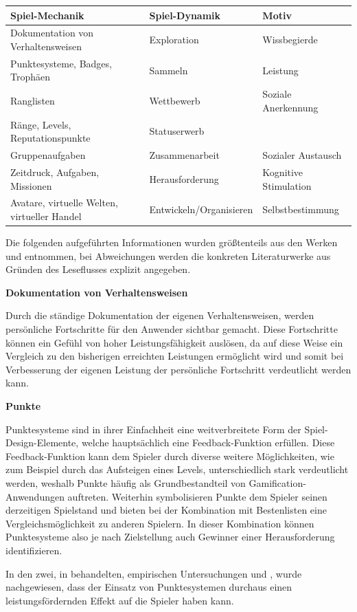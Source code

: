 \documentclass[bibliography=totoc,listof=totoc,BCOR=5mm,DIV=12,oneside]{scrbook}
\begin{document}
\bigskip
\begin{tabularx}{\textwidth}{l|l|X}
	\toprule
	\textbf{Spiel-Mechanik} & \textbf{Spiel-Dynamik} & \textbf{Motiv}\\ \midrule
	Dokumentation von Verhaltensweisen & Exploration & Wissbegierde\\
	Punktesysteme, Badges, Trophäen & Sammeln  & Leistung\\
	Ranglisten & Wettbewerb & Soziale Anerkennung\\ 
	Ränge, Levels, Reputationspunkte & Statuserwerb  & \\
	Gruppenaufgaben & Zusammenarbeit  & Sozialer Austausch\\
	Zeitdruck, Aufgaben, Missionen & Herausforderung & Kognitive Stimulation\\ 
	Avatare, virtuelle Welten, virtueller Handel & Entwickeln/Organisieren & Selbstbestimmung \\ 
	\bottomrule
\end{tabularx}
\label{tab:spielDesignElemente}

\par \bigskip Die folgenden aufgeführten Informationen wurden größtenteils aus den Werken \citep[Kapitel 2.2.2 Analyse einzelner Spiel-Design-Elemente]{Sailer2016} und \citep[Kapitel 4 The Gamification Toolkit Game Elements]{werbach2012win} entnommen, bei Abweichungen werden die konkreten Literaturwerke aus Gründen des Leseflusses explizit angegeben.

\par \bigskip \textbf{Dokumentation von Verhaltensweisen}
\par Durch die ständige Dokumentation der eigenen Verhaltensweisen, werden persönliche Fortschritte für den Anwender sichtbar gemacht. Diese Fortschritte können ein Gefühl von hoher Leistungsfähigkeit auslösen, da auf diese Weise ein Vergleich zu den bisherigen erreichten Leistungen ermöglicht wird und somit bei Verbesserung der eigenen Leistung der persönliche Fortschritt verdeutlicht werden kann.

\par \bigskip \textbf{Punkte}
\par Punktesysteme sind in ihrer Einfachheit eine weitverbreitete Form der Spiel-Design-Elemente, welche hauptsächlich eine Feedback-Funktion erfüllen. Diese Feedback-Funktion kann dem Spieler durch diverse weitere Möglichkeiten, wie zum Beispiel durch das Aufsteigen eines Levels, unterschiedlich stark verdeutlicht werden, weshalb Punkte häufig als Grundbestandteil von Gamification-Anwendungen auftreten. Weiterhin symbolisieren Punkte dem Spieler seinen derzeitigen Spielstand und bieten bei der Kombination mit Bestenlisten eine Vergleichsmöglichkeit zu anderen Spielern. In dieser Kombination können Punktesysteme also je nach Zielstellung auch Gewinner einer Herausforderung identifizieren.
\par In den zwei, in \citep{Sailer2016} behandelten, empirischen Untersuchungen \citep{mekler2013disassembling} und \citep{mekler2013points}, wurde nachgewiesen, dass der Einsatz von Punktesystemen durchaus einen leistungsfördernden Effekt auf die Spieler haben kann.
\end{document}
